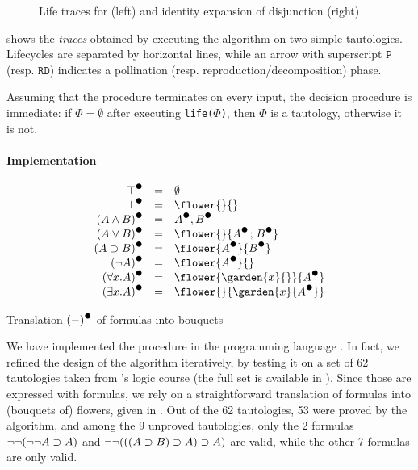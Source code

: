 \begin{scope}
\begin{figure*}
  
  \caption{Life traces for  (left) and identity expansion of
  disjunction (right)}
\end{figure*}

 shows the \emph{traces} obtained by executing the algorithm
on two simple tautologies. Lifecycles are separated by horizontal lines, while
an arrow with superscript $\mathtt{P}$ (resp. $\mathtt{RD}$) indicates a
pollination (resp. reproduction/decomposition) phase.

Assuming that the  procedure terminates on every input, the
decision procedure is immediate: if $\Phi = \emptyset$ after executing
\texttt{life($\Phi$)}, then $\Phi$ is a tautology, otherwise it is not.

\paragraph{Implementation}

\begin{marginfigure}
  $$
  \begin{array}{r@{\quad=\quad}l}
    \dtrans{\top} & \emptyset \\
    \dtrans{\bot} & \flower{}{} \\
    \dtrans{(A \land B)} & \dtrans{A}, \dtrans{B} \\
    \dtrans{(A \lor B)} & \flower{}{\dtrans{A} \sep \dtrans{B}} \\
    \dtrans{(A \limp B)} & \flower{\dtrans{A}}{\dtrans{B}} \\
    \dtrans{(\neg A)} & \flower{\dtrans{A}}{} \\
    \dtrans{(\forall x. A)} & \flower{\garden{x}{{}}}{\dtrans{A}} \\
    \dtrans{(\exists x. A)} & \flower{}{\garden{x}{\dtrans{A}}}
  \end{array}
  $$
  \caption{Translation $\dtrans{(-)}$ of formulas into bouquets}
\end{marginfigure}

We have implemented the  procedure in the  programming
language \cite{flower-auto}. In fact, we refined the design of the algorithm
iteratively, by testing it on a set of 62 tautologies taken from 's logic
course \cite{edukera} (the full set is available in
). Since those are expressed with  formulas,
we rely on a straightforward translation of formulas into (bouquets of) flowers,
given in . Out of the 62 tautologies, 53 were proved by
the algorithm, and among the 9 unproved tautologies, only the 2 formulas
$\neg\neg(\neg\neg A \supset A)$ and $\neg\neg(((A \supset B) \supset A) \supset A)$ are
 valid, while the other 7 formulas are only  valid.


\end{scope}
